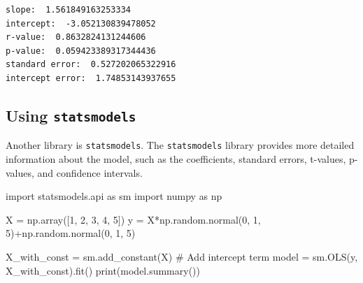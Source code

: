 \documentclass[
  letterpaper,
  DIV=11,
  numbers=noendperiod]{scrreprt}
\newenvironment{Shaded}{\begin{snugshade}}{\end{snugshade}}
\newcommand{\BuiltInTok}[1]{\textcolor[rgb]{0.00,0.23,0.31}{#1}}
\newcommand{\CommentTok}[1]{\textcolor[rgb]{0.37,0.37,0.37}{#1}}
\newcommand{\DecValTok}[1]{\textcolor[rgb]{0.68,0.00,0.00}{#1}}
\newcommand{\ImportTok}[1]{\textcolor[rgb]{0.00,0.46,0.62}{#1}}
\newcommand{\NormalTok}[1]{\textcolor[rgb]{0.00,0.23,0.31}{#1}}
\newcommand{\OperatorTok}[1]{\textcolor[rgb]{0.37,0.37,0.37}{#1}}
\begin{document}
\begin{tcolorbox}
\begin{verbatim}
slope:  1.561849163253334
intercept:  -3.052130839478052
r-value:  0.8632824131244606
p-value:  0.059423389317344436
standard error:  0.527202065322916
intercept error:  1.74853143937655
\end{verbatim}

\end{tcolorbox}

\subsection{\texorpdfstring{Using
\texttt{statsmodels}}{Using statsmodels}}\label{using-statsmodels}

Another library is \texttt{statsmodels}. The \texttt{statsmodels}
library provides more detailed information about the model, such as the
coefficients, standard errors, t-values, p-values, and confidence
intervals.

\begin{Shaded}
\begin{Highlighting}[]
\ImportTok{import}\NormalTok{ statsmodels.api }\ImportTok{as}\NormalTok{ sm}
\ImportTok{import}\NormalTok{ numpy }\ImportTok{as}\NormalTok{ np}

\NormalTok{X }\OperatorTok{=}\NormalTok{ np.array([}\DecValTok{1}\NormalTok{, }\DecValTok{2}\NormalTok{, }\DecValTok{3}\NormalTok{, }\DecValTok{4}\NormalTok{, }\DecValTok{5}\NormalTok{])}
\NormalTok{y }\OperatorTok{=}\NormalTok{ X}\OperatorTok{*}\NormalTok{np.random.normal(}\DecValTok{0}\NormalTok{, }\DecValTok{1}\NormalTok{, }\DecValTok{5}\NormalTok{)}\OperatorTok{+}\NormalTok{np.random.normal(}\DecValTok{0}\NormalTok{, }\DecValTok{1}\NormalTok{, }\DecValTok{5}\NormalTok{)}

\NormalTok{X\_with\_const }\OperatorTok{=}\NormalTok{ sm.add\_constant(X)  }\CommentTok{\# Add intercept term}
\NormalTok{model }\OperatorTok{=}\NormalTok{ sm.OLS(y, X\_with\_const).fit()}
\BuiltInTok{print}\NormalTok{(model.summary())}
\end{Highlighting}
\end{Shaded}
\end{document}
